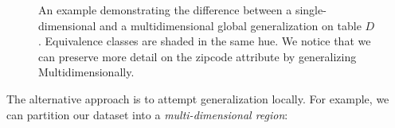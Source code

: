 \begin{figure}
\centering
{}
\caption{An example demonstrating the difference between a single-dimensional and a multidimensional global generalization on table $D$. Equivalence classes are shaded in the same hue. We notice that we can preserve more detail on the zipcode attribute by generalizing Multidimensionally.}
\label{fig:multi_vs_singledim_example}
\end{figure}

The alternative approach is to attempt generalization locally. For example, we can partition our dataset into a \textit{multi-dimensional region}:

